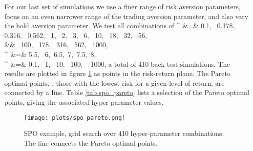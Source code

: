 \documentclass[openany]{article}  %
\begin{document}
For our last set of simulations
we use a finer range of risk aversion parameters,
focus on an even narrower range of the trading aversion parameter,
and also vary the hold aversion parameter.
We test all combinations of
\BEAS
\gamma^ &=& 0.1, ~0.178,~ 0.316, ~0.562, ~1, ~2, ~3, ~6, ~10, ~18, ~32, ~56,\\
&& \qquad ~100, ~178, ~316, ~562, ~1000,\\
\gamma^ &=& 5.5, ~6,~6.5,~7,~7.5,~8,\\
\gamma^ &=& 0.1, ~1, ~10,~ 100, ~ 1000,
\EEAS
a total of 410 back-test simulations.
The results are plotted in
figure \ref{fig:spo-pareto} as points in the risk-return plane.
The Pareto optimal points, \ie, those with the lowest risk
for a given level of return, are connected by a line.
Table \ref{tab:spo_pareto} lists a selection of the Pareto optimal points,
giving the associated hyper-parameter values.
\begin{figure}
\begin{center}
\texttt{[image: plots/spo\_pareto.png]}
\end{center}
\caption{SPO example, grid search over 410 hyper-parameter combinations.
The line connects the Pareto optimal points.}
\label{fig:spo-pareto}
\end{figure}
\end{document}
